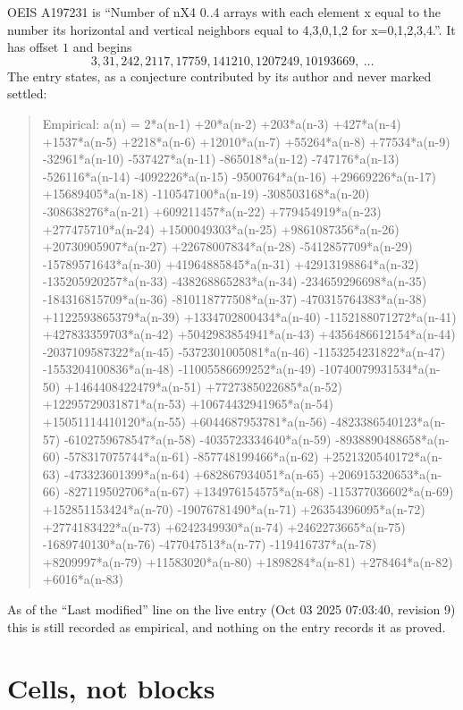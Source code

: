 \documentclass[11pt,a4paper]{article}
\theoremstyle{plain}
\theoremstyle{definition}
\begin{document}
OEIS A197231 is ``Number of nX4 0..4 arrays with each element x equal to the number its horizontal and vertical neighbors equal to 4,3,0,1,2 for x=0,1,2,3,4.''. It has offset $1$ and begins
\[
3, 31, 242, 2117, 17759, 141210, 1207249, 10193669,\ \dots
\]
The entry states, as a conjecture contributed by its author and never marked settled:
\begin{quote}
Empirical: a(n) = 2*a(n-1) +20*a(n-2) +203*a(n-3) +427*a(n-4) +1537*a(n-5) +2218*a(n-6) +12010*a(n-7) +55264*a(n-8) +77534*a(n-9) -32961*a(n-10) -537427*a(n-11) -865018*a(n-12) -747176*a(n-13) -526116*a(n-14) -4092226*a(n-15) -9500764*a(n-16) +29669226*a(n-17) +15689405*a(n-18) -110547100*a(n-19) -308503168*a(n-20) -308638276*a(n-21) +609211457*a(n-22) +779454919*a(n-23) +277475710*a(n-24) +1500049303*a(n-25) +9861087356*a(n-26) +20730905907*a(n-27) +22678007834*a(n-28) -5412857709*a(n-29) -15789571643*a(n-30) +41964885845*a(n-31) +42913198864*a(n-32) -135205920257*a(n-33) -438268865283*a(n-34) -234659296698*a(n-35) -184316815709*a(n-36) -810118777508*a(n-37) -470315764383*a(n-38) +1122593865379*a(n-39) +1334702800434*a(n-40) -1152188071272*a(n-41) +427833359703*a(n-42) +5042983854941*a(n-43) +4356486612154*a(n-44) -2037109587322*a(n-45) -5372301005081*a(n-46) -1153254231822*a(n-47) -1553204100836*a(n-48) -11005586699252*a(n-49) -10740079931534*a(n-50) +1464408422479*a(n-51) +7727385022685*a(n-52) +12295729031871*a(n-53) +10674432941965*a(n-54) +15051114410120*a(n-55) +6044687953781*a(n-56) -4823386540123*a(n-57) -6102759678547*a(n-58) -4035723334640*a(n-59) -8938890488658*a(n-60) -578317075744*a(n-61) -857748199466*a(n-62) +2521320540172*a(n-63) -473323601399*a(n-64) +682867934051*a(n-65) +206915320653*a(n-66) -827119502706*a(n-67) +134976154575*a(n-68) -115377036602*a(n-69) +152851153424*a(n-70) -19076781490*a(n-71) +26354396095*a(n-72) +2774183422*a(n-73) +6242349930*a(n-74) +2462273665*a(n-75) -1689740130*a(n-76) -477047513*a(n-77) -119416737*a(n-78) +8209997*a(n-79) +11583020*a(n-80) +1898284*a(n-81) +278464*a(n-82) +6016*a(n-83)
\end{quote}
As of the ``Last modified'' line on the live entry (Oct 03 2025 07:03:40, revision 9) this is still
recorded as empirical, and nothing on the entry records it as proved.

\section{Cells, not blocks}
\end{document}
